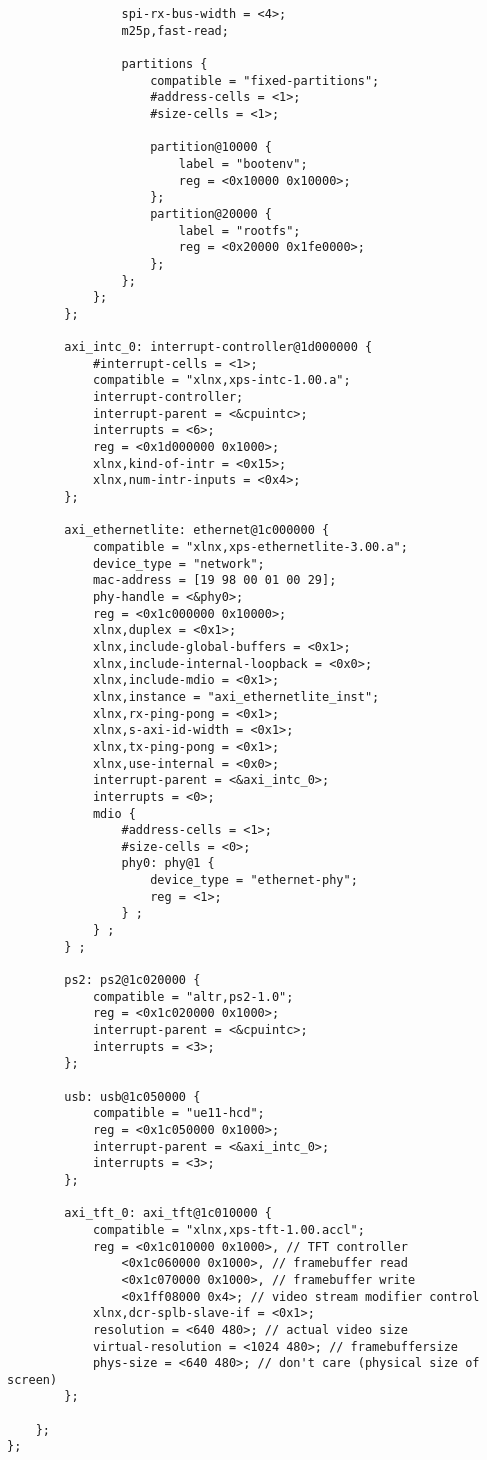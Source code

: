 \begin{verbatim}
                spi-rx-bus-width = <4>;
                m25p,fast-read;

                partitions {
                    compatible = "fixed-partitions";
                    #address-cells = <1>;
                    #size-cells = <1>;

                    partition@10000 {
                        label = "bootenv";
                        reg = <0x10000 0x10000>;
                    };
                    partition@20000 {
                        label = "rootfs";
                        reg = <0x20000 0x1fe0000>;
                    };
                };
            };
        };

        axi_intc_0: interrupt-controller@1d000000 {
            #interrupt-cells = <1>;
            compatible = "xlnx,xps-intc-1.00.a";
            interrupt-controller;
            interrupt-parent = <&cpuintc>;
            interrupts = <6>;
            reg = <0x1d000000 0x1000>;
            xlnx,kind-of-intr = <0x15>;
            xlnx,num-intr-inputs = <0x4>;
        };

        axi_ethernetlite: ethernet@1c000000 {
            compatible = "xlnx,xps-ethernetlite-3.00.a";
            device_type = "network";
            mac-address = [19 98 00 01 00 29];
            phy-handle = <&phy0>;
            reg = <0x1c000000 0x10000>;
            xlnx,duplex = <0x1>;
            xlnx,include-global-buffers = <0x1>;
            xlnx,include-internal-loopback = <0x0>;
            xlnx,include-mdio = <0x1>;
            xlnx,instance = "axi_ethernetlite_inst";
            xlnx,rx-ping-pong = <0x1>;
            xlnx,s-axi-id-width = <0x1>;
            xlnx,tx-ping-pong = <0x1>;
            xlnx,use-internal = <0x0>;
            interrupt-parent = <&axi_intc_0>;
            interrupts = <0>;
            mdio {
                #address-cells = <1>;
                #size-cells = <0>;
                phy0: phy@1 {
                    device_type = "ethernet-phy";
                    reg = <1>;
                } ;
            } ;
        } ;

        ps2: ps2@1c020000 {
            compatible = "altr,ps2-1.0";
            reg = <0x1c020000 0x1000>;
            interrupt-parent = <&cpuintc>;
            interrupts = <3>;
        };

        usb: usb@1c050000 {
            compatible = "ue11-hcd";
            reg = <0x1c050000 0x1000>;
            interrupt-parent = <&axi_intc_0>;
            interrupts = <3>;
        };

        axi_tft_0: axi_tft@1c010000 {
            compatible = "xlnx,xps-tft-1.00.accl";
            reg = <0x1c010000 0x1000>, // TFT controller
                <0x1c060000 0x1000>, // framebuffer read
                <0x1c070000 0x1000>, // framebuffer write
                <0x1ff08000 0x4>; // video stream modifier control
            xlnx,dcr-splb-slave-if = <0x1>;
            resolution = <640 480>; // actual video size
            virtual-resolution = <1024 480>; // framebuffersize
            phys-size = <640 480>; // don't care (physical size of screen)
        };

    };
};
\end{verbatim}